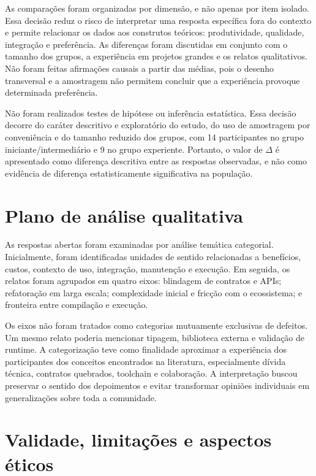 As comparações foram organizadas por dimensão, e não apenas por item isolado. Essa decisão reduz o risco de interpretar uma resposta específica fora do contexto e permite relacionar os dados aos construtos teóricos: produtividade, qualidade, integração e preferência. As diferenças foram discutidas em conjunto com o tamanho dos grupos, a experiência em projetos grandes e os relatos qualitativos. Não foram feitas afirmações causais a partir das médias, pois o desenho transversal e a amostragem não permitem concluir que a experiência provoque determinada preferência.

Não foram realizados testes de hipótese ou inferência estatística. Essa decisão decorre do caráter descritivo e exploratório do estudo, do uso de amostragem por conveniência e do tamanho reduzido dos grupos, com 14 participantes no grupo iniciante/intermediário e 9 no grupo experiente. Portanto, o valor de $\Delta$ é apresentado como diferença descritiva entre as respostas observadas, e não como evidência de diferença estatisticamente significativa na população.

\section{Plano de análise qualitativa}

As respostas abertas foram examinadas por análise temática categorial. Inicialmente, foram identificadas unidades de sentido relacionadas a benefícios, custos, contexto de uso, integração, manutenção e execução. Em seguida, os relatos foram agrupados em quatro eixos: blindagem de contratos e APIs; refatoração em larga escala; complexidade inicial e fricção com o ecossistema; e fronteira entre compilação e execução.

Os eixos não foram tratados como categorias mutuamente exclusivas de defeitos. Um mesmo relato poderia mencionar tipagem, biblioteca externa e validação de runtime. A categorização teve como finalidade aproximar a experiência dos participantes dos conceitos encontrados na literatura, especialmente dívida técnica, contratos quebrados, toolchain e colaboração. A interpretação buscou preservar o sentido dos depoimentos e evitar transformar opiniões individuais em generalizações sobre toda a comunidade.

\section{Validade, limitações e aspectos éticos}

